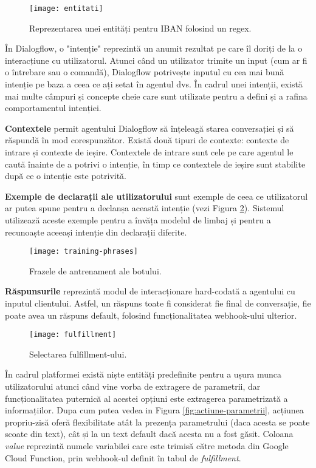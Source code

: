 \begin{figure}[h]
    \centering
    \texttt{[image: entitati]}
    \caption{Reprezentarea unei entități pentru IBAN folosind un regex.}
    \label{fig:entitati}
\end{figure}

În Dialogflow, o "intenție" reprezintă un anumit rezultat pe care îl doriți de la o interacțiune cu utilizatorul. Atunci când un utilizator trimite un input (cum ar fi o întrebare sau o comandă), Dialogflow potrivește inputul cu cea mai bună intenție pe baza a ceea ce ați setat în agentul dvs. În cadrul unei intenții, există mai multe câmpuri și concepte cheie care sunt utilizate pentru a defini și a rafina comportamentul intenției.

\textbf{Contextele} permit agentului Dialogflow să înțeleagă starea conversației și să răspundă în mod corespunzător. Există două tipuri de contexte: contexte de intrare și contexte de ieșire. Contextele de intrare sunt cele pe care agentul le caută înainte de a potrivi o intenție, în timp ce contextele de ieșire sunt stabilite după ce o intenție este potrivită.

\textbf{Exemple de declarații ale utilizatorului} sunt exemple de ceea ce utilizatorul ar putea spune pentru a declanșa această intenție (vezi Figura \ref{fig:training-phrases}). Sistemul utilizează aceste exemple pentru a învăța modelul de limbaj și pentru a recunoaște aceeași intenție din declarații diferite.

\begin{figure}[H]
    \centering
    \texttt{[image: training-phrases]}
    \caption{Frazele de antrenament ale botului.}
    \label{fig:training-phrases}
\end{figure}

\textbf{Răspunsurile} reprezintă modul de interacționare hard-codată a agentului cu inputul clientului. Astfel, un răspuns toate fi considerat fie final de conversație, fie poate avea un răspuns default, folosind funcționalitatea webhook-ului ulterior.

\begin{figure}[H]
    \centering
    \texttt{[image: fulfillment]}
    \caption{Selectarea fulfillment-ului.}
    \label{fig:fulfillment}
\end{figure}

În cadrul platformei există niște entități predefinite \cite{system-entities} pentru a ușura munca utilizatorului atunci când vine vorba de extragere de parametrii, dar funcționalitatea puternică al acestei opțiuni este extragerea parametrizată a informațiilor. Dupa cum putea vedea in Figura \ref{fig:actiune-parametrii}, acțiunea propriu-zisă oferă flexibilitate atât la prezența parametrului (daca acesta se poate scoate din text), cât și la un text default dacă acesta nu a fost găsit. Coloana \emph{value} reprezintă numele variabilei care este trimisă către metoda din Google Cloud Function, prin webhook-ul definit în tabul de \emph{fulfillment}.

